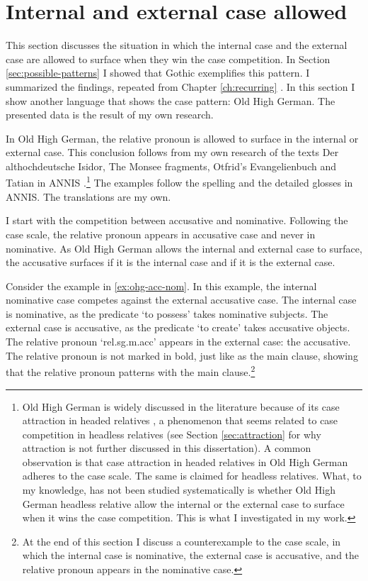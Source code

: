 \section{Internal and external case allowed}\label{sec:pattern-i}

This section discusses the situation in which the internal case and the external case are allowed to surface when they win the case competition. In Section \ref{sec:possible-patterns} I showed that Gothic exemplifies this pattern. I summarized the findings, repeated from Chapter \ref{ch:recurring} \citep{harbert1978}. In this section I show another language that shows the case pattern: Old High German. The presented data is the result of my own research.

In Old High German, the relative pronoun is allowed to surface in the internal or external case. This conclusion follows from my own research of the texts Der althochdeutsche Isidor, The Monsee fragments, Otfrid's Evangelienbuch and Tatian in ANNIS \citep{krause2016}.\footnote{
Old High German is widely discussed in the literature because of its case attraction in headed relatives \citep[cf.][]{pittner1995}, a phenomenon that seems related to case competition in headless relatives (see Section \ref{sec:attraction} for why attraction is not further discussed in this dissertation).
A common observation is that case attraction in headed relatives in Old High German adheres to the case scale. The same is claimed for headless relatives.
What, to my knowledge, has not been studied systematically is whether Old High German headless relative allow the internal or the external case to surface when it wins the case competition. This is what I investigated in my work.
}
The examples follow the spelling and the detailed glosses in ANNIS. The translations are my own.

I start with the competition between accusative and nominative. Following the case scale, the relative pronoun appears in accusative case and never in nominative. As Old High German allows the internal and external case to surface, the accusative surfaces if it is the internal case and if it is the external case.

Consider the example in \ref{ex:ohg-acc-nom}. In this example, the internal nominative case competes against the external accusative case.
The internal case is nominative, as the predicate  `to possess' takes nominative subjects.
The external case is accusative, as the predicate  `to create' takes accusative objects.
The relative pronoun  `\ac{rel}.\ac{sg}.\ac{m}.\ac{acc}' appears in the external case: the accusative. The relative pronoun is not marked in bold, just like as the main clause, showing that the relative pronoun patterns with the main clause.\footnote{
At the end of this section I discuss a counterexample to the case scale, in which the internal case is nominative, the external case is accusative, and the relative pronoun appears in the nominative case.
}


